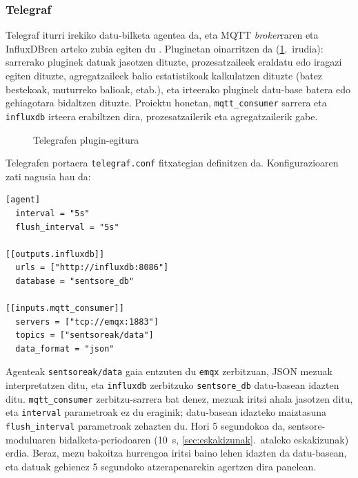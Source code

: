 \documentclass[10pt]{article}
\begin{document}
\subsubsection{Telegraf}

Telegraf iturri irekiko datu-bilketa agentea da, eta \ac{MQTT} \textit{broker}raren eta InfluxDBren arteko zubia egiten du \cite{influxdata_chronograf,chan2019resource}. Pluginetan oinarritzen da (\ref{fig:telegrafirudia}.~irudia): sarrerako pluginek datuak jasotzen dituzte, prozesatzaileek eraldatu edo iragazi egiten dituzte, agregatzaileek balio estatistikoak kalkulatzen dituzte (batez bestekoak, muturreko balioak, etab.), eta irteerako pluginek datu-base batera edo gehiagotara bidaltzen dituzte. Proiektu honetan, \texttt{mqtt\_consumer} sarrera eta \texttt{influxdb} irteera erabiltzen dira, prozesatzailerik eta agregatzailerik gabe.

\begin{figure}[!htbp]
\centering
{}
\caption{Telegrafen plugin-egitura}
\label{fig:telegrafirudia}
\end{figure}

Telegrafen portaera \texttt{telegraf.conf} fitxategian definitzen da. Konfigurazioaren zati nagusia hau da:

\begin{lstlisting}[style=terminal]
[agent]
  interval = "5s"
  flush_interval = "5s"

[[outputs.influxdb]]
  urls = ["http://influxdb:8086"]
  database = "sentsore_db"

[[inputs.mqtt_consumer]]
  servers = ["tcp://emqx:1883"]
  topics = ["sentsoreak/data"]
  data_format = "json"
\end{lstlisting}

Agenteak \texttt{sentsoreak/data} gaia entzuten du \texttt{emqx} zerbitzuan, \ac{JSON} mezuak interpretatzen ditu, eta \texttt{influxdb} zerbitzuko \texttt{sentsore\_db} datu-basean idazten ditu. \texttt{mqtt\_consumer} zerbitzu-sarrera bat denez, mezuak iritsi ahala jasotzen ditu, eta \texttt{interval} parametroak ez du eraginik; datu-basean idazteko maiztasuna \texttt{flush\_interval} parametroak zehazten du. Hori 5 segundokoa da, sentsore-moduluaren bidalketa-periodoaren (10~s, \ref{sec:eskakizunak}.~ataleko eskakizunak) erdia. Beraz, mezu bakoitza hurrengoa iritsi baino lehen idazten da datu-basean, eta datuak gehienez 5 segundoko atzerapenarekin agertzen dira panelean.\\
\end{document}

